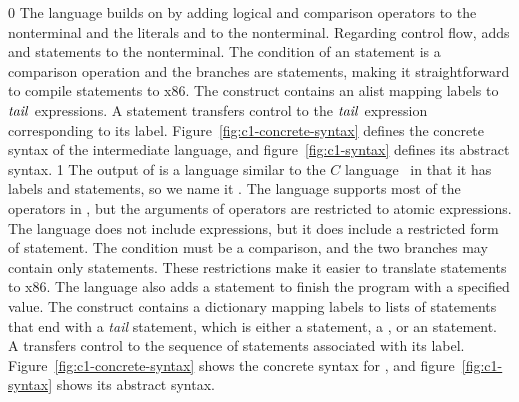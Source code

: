 \documentclass[7x10]{TimesAPriori_MIT}%
\def\racketEd{0}
\def\pythonEd{1}
\def\edition{1}
\newcommand{\pythonColor}[0]{}
\numberwithin{theorem}{chapter}
\numberwithin{definition}{chapter}
\numberwithin{equation}{chapter}
\begin{document}
{\if\edition\racketEd
%
The \LangCIf{} language builds on \LangCVar{} by adding logical and
comparison operators to the \Exp{} nonterminal and the literals
\TRUE{} and \FALSE{} to the \Atm{} nonterminal.  Regarding control
flow, \LangCIf{} adds  and  statements to the
\Tail{} nonterminal. The condition of an  statement is a
comparison operation and the branches are  statements,
making it straightforward to compile  statements to x86.  The
 construct contains an alist mapping labels to $\mathit{tail}$
expressions. A  statement transfers control to the $\mathit{tail}$
expression corresponding to its label.
%
Figure~\ref{fig:c1-concrete-syntax} defines the concrete syntax of the
\LangCIf{} intermediate language, and figure~\ref{fig:c1-syntax}
defines its abstract syntax.
%
\fi}
%
{\if\edition\pythonEd\pythonColor
%
The output of  is a language similar to the
$C$ language~\citep{Kernighan:1988nx} in that it has labels and
 statements, so we name it \LangCIf{}.  
%
The \LangCIf{} language supports most of the operators in \LangIf{}, but
the arguments of operators are restricted to atomic expressions. The
\LangCIf{} language does not include  expressions, but it does
include a restricted form of  statement. The condition must be
a comparison, and the two branches may contain only 
statements. These restrictions make it easier to translate 
statements to x86.  The \LangCIf{} language also adds a 
statement to finish the program with a specified value.
%
The  construct contains a dictionary mapping labels to
lists of statements that end with a \emph{tail} statement, which is
either a  statement, a , or an
 statement.
%
A  transfers control to the sequence of statements
associated with its label.
%
Figure~\ref{fig:c1-concrete-syntax} shows the concrete syntax for \LangCIf{},
and figure~\ref{fig:c1-syntax} shows its
abstract syntax.
%
\fi}
%

\newcommand{\CifGrammarRacket}{
\begin{array}{lcl}
\Atm &::=& \itm{bool} \\
\itm{cmp} &::= & \code{eq?} \MID \code{<} \MID \code{<=} \MID \code{>} \MID \code{>=} \\
\Exp &::=& \CNOT{\Atm} \MID \LP \itm{cmp}~\Atm~\Atm\RP \\
\Tail &::= & \key{goto}~\itm{label}\key{;}\\
   &\MID& \key{if}~\LP \itm{cmp}~\Atm~\Atm \RP~ \key{goto}~\itm{label}\key{;} ~\key{else}~\key{goto}~\itm{label}\key{;} 
\end{array}
}
\end{document}
